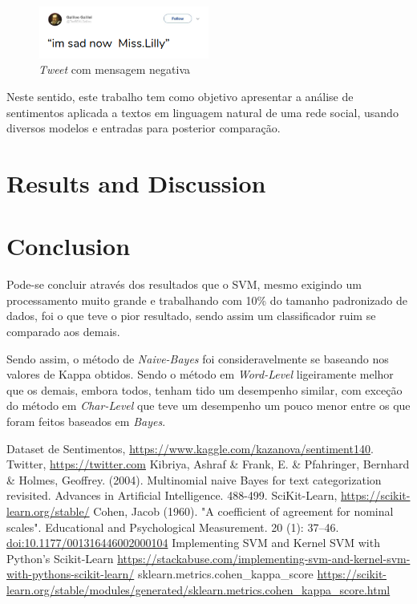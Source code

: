 \documentclass[conference]{IEEEtran}
\begin{document}
\begin{figure}[htbp]
	\includegraphics[width=0.5\textwidth,center]{imgs/tweet_negativo.png}
	\caption{\textit{Tweet} com mensagem negativa}
	\label{fig:dataset_negativo}
\end{figure}

Neste sentido, este trabalho tem como objetivo apresentar a análise de
sentimentos aplicada a textos em linguagem natural de uma rede social, usando diversos modelos e entradas para posterior comparação.

\section{Results and Discussion}

\section{Conclusion}

Pode-se concluir através dos resultados que o SVM, mesmo exigindo um processamento muito grande e trabalhando com 10\% do tamanho padronizado de dados, foi o que teve o pior resultado, sendo assim um classificador ruim se comparado aos demais.

Sendo assim, o método de \textit{Naive-Bayes} foi consideravelmente se baseando nos valores de Kappa obtidos. Sendo o método em \textit{Word-Level} ligeiramente melhor que os demais, embora todos, tenham tido um desempenho similar, com exceção do método em \textit{Char-Level} que teve um desempenho um pouco menor entre os que foram feitos baseados em \textit{Bayes}.

\begin{thebibliography}{00}
 Dataset de Sentimentos, \url{https://www.kaggle.com/kazanova/sentiment140}.
 Twitter, \url{https://twitter.com}
 Kibriya, Ashraf \& Frank, E. \& Pfahringer, Bernhard \& Holmes, Geoffrey. (2004). Multinomial naive Bayes for text categorization revisited. Advances in Artificial Intelligence. 488-499. \label{kibriya}
 SciKit-Learn, \url{https://scikit-learn.org/stable/}
 Cohen, Jacob (1960). "A coefficient of agreement for nominal scales". Educational and Psychological Measurement. 20 (1): 37–46. \url{doi:10.1177/001316446002000104}
 Implementing SVM and Kernel SVM with Python's Scikit-Learn \url{https://stackabuse.com/implementing-svm-and-kernel-svm-with-pythons-scikit-learn/}
 sklearn.metrics.cohen\_kappa\_score \url{https://scikit-learn.org/stable/modules/generated/sklearn.metrics.cohen_kappa_score.html}

\end{thebibliography}
\end{document}
